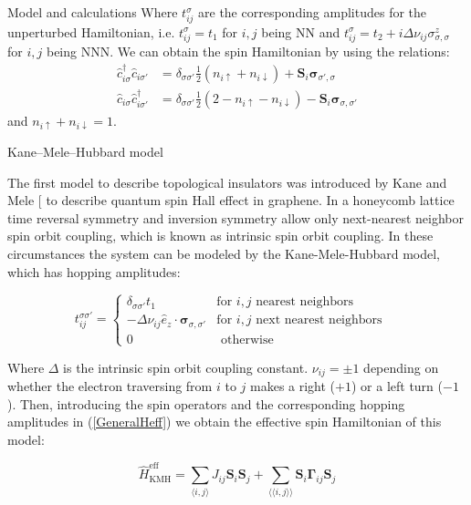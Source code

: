 \documentclass[aps,prl,twocolumn,amsmath,amssymb,superscriptaddress,nobibnotes]{revtex4}%
\renewcommand{\cite}[1]{{[}\onlinecite{#1}{]}}
\newcommand{\n}{\nonumber}
\newcommand{\bs}{\boldsymbol}
\begin{document}
\begin{section}{Model and calculations}
Where $t_{ij}^{\sigma}$ are the corresponding amplitudes for the unperturbed Hamiltonian, i.e. $t_{ij}^{\sigma} = t_1$ for $i,j$ being NN and $t_{ij}^{\sigma} = t_2 + i\Delta\nu_{ij}\sigma^z_{\sigma, \sigma}$ for $i,j$ being NNN. We can obtain the spin Hamiltonian by using the relations:
\begin{align}
\hat{c}_{i \sigma}^\dagger \hat{c}_{i \sigma'} &= \delta_{\sigma \sigma'} \frac{1}{2} (n_{i \uparrow} + n_{i \downarrow}) + \boldsymbol{S}_i\boldsymbol{\sigma}_{\sigma', \sigma} \label{SpinOperatorInv1}\\ 
\hat{c}_{i \sigma} \hat{c}_{i \sigma'}^\dagger &= \delta_{\sigma \sigma'} \frac{1}{2} (2 - n_{i \uparrow} - n_{i \downarrow}) - \boldsymbol{S}_i\boldsymbol{\sigma}_{\sigma, \sigma'} \label{SpinOperatorInv2}
\end{align}
and $n_{i \uparrow} + n_{i \downarrow} = 1$.

\begin{subsection}{Kane--Mele--Hubbard model}

The first model to describe topological insulators was introduced by Kane and Mele \cite{Kane2005} to describe quantum spin Hall effect in graphene. In a honeycomb lattice time reversal symmetry and inversion symmetry allow only next-nearest neighbor spin orbit coupling, which is known as intrinsic spin orbit coupling. In these circumstances the system can be modeled by the Kane-Mele-Hubbard model, which has hopping amplitudes:

\begin{equation}
t_{ij}^{\sigma \sigma'} = \begin{cases}
	\delta_{\sigma \sigma'}t_1 & \text{for } i, j \text{ nearest neighbors} \\
	-\Delta \nu_{ij} \hat{e}_z \cdot \bs{\sigma}_{\sigma, \sigma'} & \text{for } i, j \text{ next nearest neighbors} \\
	0 & \text{ otherwise} \n
\end{cases} \quad
\end{equation}

Where $\Delta$ is the intrinsic spin orbit coupling constant. $\nu_{ij}=\pm 1$ depending on whether the electron traversing from $i$ to $j$ makes a right ($+1$) or a left turn ($-1$). Then, introducing the spin operators and the corresponding hopping amplitudes in (\ref{GeneralHeff}) we obtain the effective spin Hamiltonian of this model:

\begin{equation}
\label{KMHeff}
\hat{H}_{\text{KMH}}^{\text{eff}} = \sum_{\langle i,j \rangle} J_{ij} \bs{S}_i \bs{S}_j + \sum_{\langle \langle i,j \rangle \rangle} \bs{S}_i \bs{\Gamma}_{ij} \bs{S}_j 
\end{equation}


\end{subsection}
\end{section}
\end{document}
